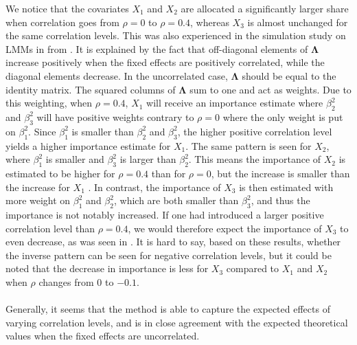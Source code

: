 We notice that the covariates $X_1$ and $X_2$ are allocated a significantly larger share when correlation goes from $\rho=0$ to $\rho=0.4$, whereas $X_3$ is almost unchanged for the same correlation levels. This was also experienced in the simulation study on LMMs in  from \citet{Arnstad:Relative_variable_importance_in_Bayesian_linear_mixed_models:2024}. It is explained by the fact that off-diagonal elements of $\boldsymbol{\Lambda}$ increase positively when the fixed effects are positively correlated, while the diagonal elements decrease. In the uncorrelated case, $\boldsymbol{\Lambda}$ should be equal to the identity matrix. The squared columns of $\boldsymbol{\Lambda}$ sum to one and act as weights. Due to this weighting, when $\rho=0.4$, $X_1$ will receive an importance estimate where $\beta_2^2$ and $\beta_3^2$ will have positive weights contrary to $\rho=0$ where the only weight is put on $\beta_1^2$. Since $\beta_1^2$ is smaller than $\beta_2^2$ and $\beta_3^2$, the higher positive correlation level yields a higher importance estimate for $X_1$. The same pattern is seen for $X_2$, where $\beta_1^2$ is smaller and $\beta_3^2$ is larger than $\beta_2^2$. This means the importance of $X_2$ is estimated to be higher for $\rho=0.4$ than for $\rho=0$, but the increase is smaller than the increase for $X_1$ \citep{Arnstad:Relative_variable_importance_in_Bayesian_linear_mixed_models:2024}. In contrast, the importance of $X_3$ is then estimated with more weight on $\beta_1^2$ and $\beta_2^2$, which are both smaller than $\beta_3^2$, and thus the importance is not notably increased. If one had introduced a larger positive correlation level than $\rho=0.4$, we would therefore expect the importance of $X_3$ to even decrease, as was seen in \citet{Arnstad:Relative_variable_importance_in_Bayesian_linear_mixed_models:2024}. It is hard to say, based on these results, whether the inverse pattern can be seen for negative correlation levels, but it could be noted that the decrease in importance is less for $X_3$ compared to $X_1$ and $X_2$ when $\rho$ changes from $0$ to $-0.1$.
\\
\\
Generally, it seems that the method is able to capture the expected effects of varying correlation levels, and is in close agreement with the expected theoretical values when the fixed effects are uncorrelated. 
